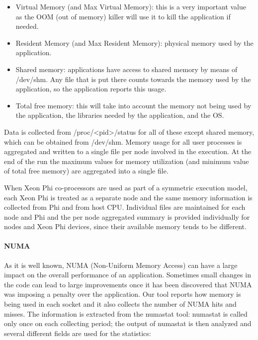 \documentclass[10pt,a4paper]{report}
\begin{document}
\begin{itemize}
\item Virtual Memory (and Max Virtual Memory): this is a very important value as the OOM (out of memory) killer will use it to kill the application if needed.
\item Resident Memory (and Max Resident Memory): physical memory used by the application.
\item Shared memory: applications have access to shared memory by means of /dev/shm. Any file that is put there counts towards the memory used by the application, so the application reports this usage.
\item Total free memory: this will take into account the memory not being used by the application, the libraries needed by the application, and the OS.
\end{itemize}

Data is collected from /proc/\textless pid\textgreater /status for all of these except shared memory, which can be obtained from /dev/shm. Memory usage for all user processes is aggregated and written to a single file per node involved in the execution. At the end of the run the maximum values for memory utilization (and minimum value of total free memory) are aggregated into a single file.

When Xeon Phi co-processors are used as part of a symmetric execution model, each Xeon Phi is treated as a separate node and the same memory information is collected from Phi and from host CPU. Individual files are maintained for each node and Phi and the per node aggregated summary is provided individually for nodes and Xeon Phi devices, since their available memory tends to be different.

\paragraph{NUMA}
As it is well known, NUMA (Non-Uniform Memory Access) can have a large impact on the overall performance of an application. Sometimes small changes in the code can lead to large improvements once it has been discovered that NUMA was imposing a penalty over the application. Our tool reports how memory is being used in each socket and it also collects the number of NUMA hits and misses. The information is extracted from the numastat tool: numastat is called only once on each collecting period; the output of numastat is then analyzed and several different fields are used for the statistics:
\end{document}
